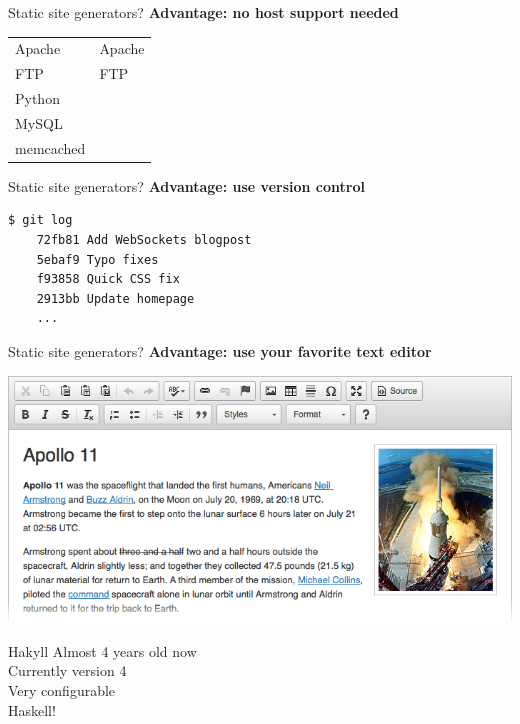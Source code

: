 \documentclass[20pt]{beamer}
\newcommand{\vspaced}{
    \vspace{5mm}
}
\begin{document}
\begin{frame}{Static site generators?}
    \textbf{Advantage: no host support needed} \\
    \vspaced
    \begin{center}
    \begin{tabular}{l|l}
    Apache    & Apache \\
    FTP       & FTP    \\
    Python    &        \\
    MySQL     &        \\
    memcached &        \\
    \end{tabular}
    \end{center}
\end{frame}

\begin{frame}[fragile]{Static site generators?}
    \textbf{Advantage: use version control} \\
    \vspaced
    \begin{lstlisting}[language=bash]
    $ git log
    72fb81 Add WebSockets blogpost
    5ebaf9 Typo fixes
    f93858 Quick CSS fix
    2913bb Update homepage
    ...
    \end{lstlisting}
\end{frame}

\begin{frame}{Static site generators?}
    \textbf{Advantage: use your favorite text editor} \\
    \vspaced
    \includegraphics[width=\textwidth]{images/wysiwyg.png}
\end{frame}


\begin{frame}{Hakyll}
    Almost 4 years old now \\
    Currently version 4 \\
    Very configurable \\
    Haskell! \\
\end{frame}
\end{document}
